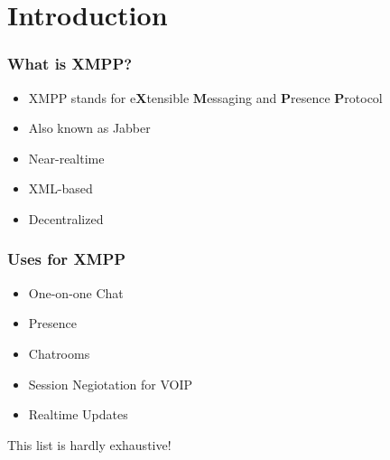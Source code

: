 \part{Introduction}

\newpage
\section*{What is XMPP?}
\pause

\begin{itemize}
\item XMPP stands for e\textbf{X}tensible \textbf{M}essaging and \textbf{P}resence \textbf{P}rotocol
\pause
\item Also known as Jabber
\pause
\item Near-realtime
\pause
\item XML-based
\pause
\item Decentralized
\end{itemize}

\newpage
\section*{Uses for XMPP}
\pause

\begin{itemize}
\item One-on-one Chat
\pause
\item Presence
\pause
\item Chatrooms
\pause
\item Session Negiotation for VOIP
\pause
\item Realtime Updates
\end{itemize}

\pause
\vfill
This list is hardly exhaustive!
